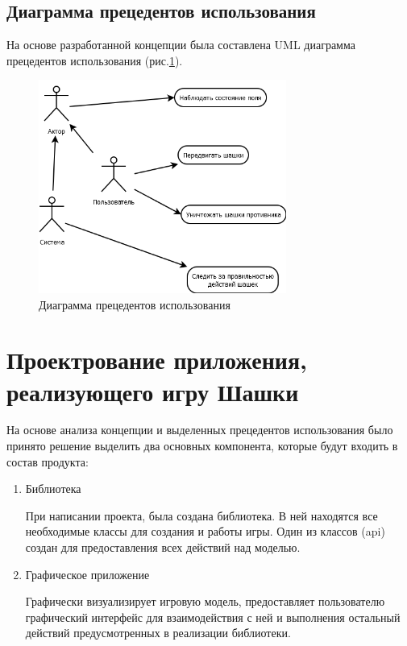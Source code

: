 \documentclass[a4paper]{article}
\begin{document}
\subsection{Диаграмма прецедентов использования}
На основе разработанной концепции была составлена UML диаграмма прецедентов использования (рис.\ref{pic:Diagram1}).

\begin{figure}[H]
	\begin{center}
		\includegraphics[scale=0.4, height=7cm]{Diagram1}
		\caption{Диаграмма прецедентов использования} 
		\label{pic:Diagram1} %
	\end{center}
\end{figure}

\section{Проектрование приложения, реализующего игру Шашки}
На основе анализа концепции и выделенных прецедентов использования было принято решение выделить два основных компонента, которые будут входить в состав продукта:

\begin{enumerate}
		\item Библиотека
		
		При написании проекта, была создана библиотека. В ней находятся все необходимые классы для создания и работы игры. Один из классов (api) создан для предоставления всех действий над моделью.
		
		\item Графическое приложение 
		
		Графически визуализирует игровую модель, предоставляет пользователю графический интерфейс для взаимодействия с ней и выполнения остальный действий предусмотренных в реализации библиотеки. 
\end{enumerate}
\end{document}
